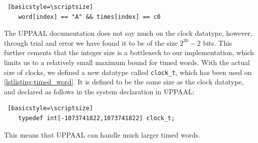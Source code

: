 \begin{lstlisting} [basicstyle=\scriptsize]
    word[index] == "A" && times[index] == c0
\end{lstlisting}

The UPPAAL documentation does not say much on the clock datatype, however, through trial and error we have found it to be of the size $2^{30}-2$ bits.
This further cements that the integer size is a bottleneck to our implementation, which limits us to a relatively small maximum bound for timed words.
With the actual size of clocks, we defined a new datatype called \verb|clock_t|, which has been used on \cref{lstlisting:timed_word}. It is defined to be the same size as the clock datatype, and declared as follows in the system declaration in UPPAAL:

\begin{lstlisting} [basicstyle=\scriptsize]
    typedef int[-1073741822,1073741822] clock_t;
\end{lstlisting}

This means that UPPAAL can handle much larger timed words.

